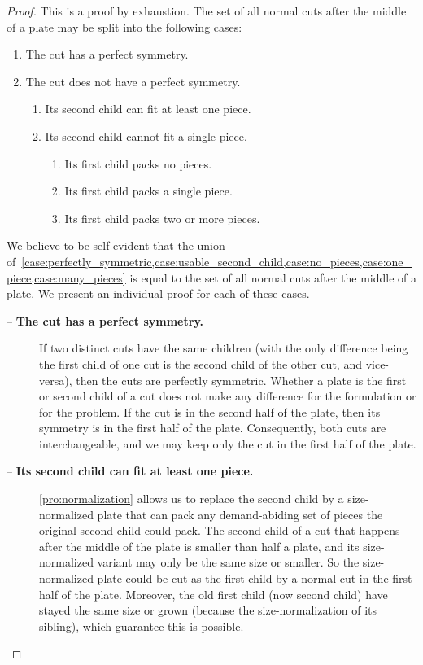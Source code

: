 \documentclass[smallextended]{svjour3}       %
\begin{document}
\begin{proof}
This is a proof by exhaustion. The set of all normal cuts after the middle of a plate may be split into the following cases:
\begin{enumerate}
  \item The cut has a perfect symmetry. \label{case:perfectly_symmetric}
  \item The cut does not have a perfect symmetry.
  \begin{enumerate}
    \item Its second child can fit at least one piece. \label{case:usable_second_child}
    \item Its second child cannot fit a single piece.
    \begin{enumerate}
      \item Its first child packs no pieces. \label{case:no_pieces}
      \item Its first child packs a single piece. \label{case:one_piece} %
      \item Its first child packs two or more pieces. \label{case:many_pieces}
    \end{enumerate}
  \end{enumerate}
\end{enumerate}

We believe to be self-evident that the union of~\cref{case:perfectly_symmetric,case:usable_second_child,case:no_pieces,case:one_piece,case:many_pieces} is equal to the set of all normal cuts after the middle of a plate. We present an individual proof for each of these cases.

\begin{description}
\item[ -- \textbf{The cut has a perfect symmetry.}]
If two distinct cuts have the same children (with the only difference being the first child of one cut is the second child of the other cut, and vice-versa), then the cuts are perfectly symmetric.
Whether a plate is the first or second child of a cut does not make any difference for the formulation or for the problem.
If the cut is in the second half of the plate, then its symmetry is in the first half of the plate.
Consequently, both cuts are interchangeable, and we may keep only the cut in the first half of the plate.
\item[ -- \textbf{Its second child can fit at least one piece.}]
\autoref{pro:normalization} allows us to replace the second child by a size-normalized plate that can pack any demand-abiding set of pieces the original second child could pack.
The second child of a cut that happens after the middle of the plate is smaller than half a plate, and its size-normalized variant may only be the same size or smaller.
So the size-normalized plate could be cut as the first child by a normal cut in the first half of the plate.
Moreover, the old first child (now second child) have stayed the same size or grown (because the size-normalization of its sibling), which guarantee this is possible.


\end{description}
\end{proof}
\end{document}
